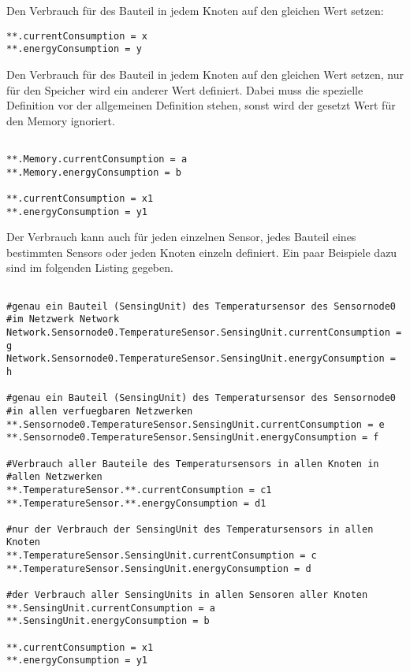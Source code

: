 Den Verbrauch für des Bauteil in jedem Knoten auf den gleichen Wert setzen:

\begin{minipage}{\textwidth}
\begin{lstlisting}
**.currentConsumption = x
**.energyConsumption = y
\end{lstlisting}
\end{minipage}

Den Verbrauch für des Bauteil in jedem Knoten auf den gleichen Wert setzen, nur für den Speicher wird ein anderer Wert definiert. Dabei muss die spezielle Definition vor der allgemeinen Definition stehen, sonst wird der gesetzt Wert für den Memory ignoriert.

\begin{minipage}{\textwidth}
\begin{lstlisting}

**.Memory.currentConsumption = a
**.Memory.energyConsumption = b

**.currentConsumption = x1
**.energyConsumption = y1
\end{lstlisting}
\end{minipage}

Der Verbrauch kann auch für jeden einzelnen Sensor, jedes Bauteil eines bestimmten Sensors oder jeden Knoten einzeln definiert. Ein paar Beispiele dazu sind im folgenden Listing gegeben.

\begin{minipage}{\textwidth}
\begin{lstlisting}

#genau ein Bauteil (SensingUnit) des Temperatursensor des Sensornode0 
#im Netzwerk Network
Network.Sensornode0.TemperatureSensor.SensingUnit.currentConsumption = g
Network.Sensornode0.TemperatureSensor.SensingUnit.energyConsumption = h

#genau ein Bauteil (SensingUnit) des Temperatursensor des Sensornode0 
#in allen verfuegbaren Netzwerken
**.Sensornode0.TemperatureSensor.SensingUnit.currentConsumption = e
**.Sensornode0.TemperatureSensor.SensingUnit.energyConsumption = f

#Verbrauch aller Bauteile des Temperatursensors in allen Knoten in 
#allen Netzwerken
**.TemperatureSensor.**.currentConsumption = c1
**.TemperatureSensor.**.energyConsumption = d1

#nur der Verbrauch der SensingUnit des Temperatursensors in allen Knoten
**.TemperatureSensor.SensingUnit.currentConsumption = c
**.TemperatureSensor.SensingUnit.energyConsumption = d

#der Verbrauch aller SensingUnits in allen Sensoren aller Knoten
**.SensingUnit.currentConsumption = a
**.SensingUnit.energyConsumption = b

**.currentConsumption = x1
**.energyConsumption = y1
\end{lstlisting}
\end{minipage}

